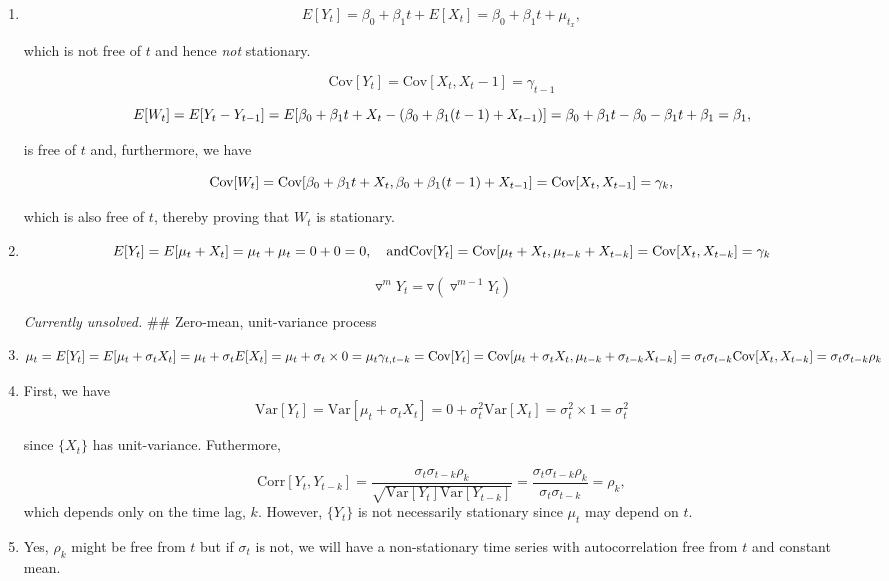 \documentclass[]{book}
\begin{document}
\begin{enumerate}
\def\labelenumi{(\alph{enumi})}
\item
  \[
    E[Y_t] = \beta_0 + \beta_1 t + E[X_t] = \beta_0 + \beta_1 t + \mu_{t_x},
  \]

  which is not free of \(t\) and hence \emph{not} stationary.

  \[
    \text{Cov}[Y_t] = \text{Cov}[X_t, X_t-1] = \gamma_{t-1}
  \]

  \[
    E[W_t] = E[Y_t - Y_{t-1}] = E[\beta_0 + \beta_1 t + X_t - (\beta_0 + \beta_1(t-1) + X_{t-1})] =\\
    \beta_0 + \beta_1 t - \beta_0 - \beta_1 t + \beta_1  = \beta_1,
  \]

  is free of \(t\) and, furthermore, we have

  \[
    \text{Cov}[W_t] = \text{Cov}[\beta_0 + \beta_1 t + X_t, \beta_0 + \beta_1 (t-1) + X_{t-1}] =\\
    \text{Cov}[X_t, X_{t-1}] = \gamma_k,  
  \]

  which is also free of \(t\), thereby proving that \(W_t\) is
  stationary.
\item
  \[
    E[Y_t] = E[\mu_t + X_t] = \mu_t + \mu_t = 0 + 0 = 0, \quad \text{and}\\
    \text{Cov}[Y_t] = \text{Cov}[\mu_t + X_t, \mu_{t-k} + X_{t-k}] = \text{Cov}[X_t, X_{t-k}] = \gamma_k
  \]

  \[
    \triangledown^m Y_t = \triangledown(\triangledown^{m−1}Y_t)
  \]

  \emph{Currently unsolved.} \#\# Zero-mean, unit-variance process
\item
  \[
    \mu_t = E[Y_t] = E[\mu_t + \sigma_t X_t] = \mu_t + \sigma_t E[X_t] = \mu_t + \sigma_t \times 0 = \mu_t\\
    \gamma_{t,t-k} = \text{Cov}[Y_t] = \text{Cov}[\mu_t + \sigma_t X_t, \mu_{t-k} + \sigma_{t-k} X_{t-k}] = 
      \sigma_t \sigma_{t-k} \text{Cov}[X_t, X_{t-k}] = \sigma_t \sigma_{t-k} \rho_k
  \]
\item
  First, we have \[
    \text{Var}[Y_t] = \text{Var}[\mu_t + \sigma_t X_t] = 0 + \sigma_t^2 \text{Var}[X_t] = \sigma_t^2 \times 1 = \sigma_t^2
  \]

  since \(\{X_t\}\) has unit-variance. Futhermore,

  \[
    \text{Corr}[Y_t, Y_{t-k}] = \frac{\sigma_t \sigma_{t-k} \rho_k}{\sqrt{\text{Var}[Y_t]\text{Var}[Y_{t-k}]}} = 
      \frac{\sigma_t \sigma_{t-k}\rho_k}{\sigma_t \sigma_{t-k}} = \rho_k,
  \] which depends only on the time lag, \(k\). However, \(\{Y_t\}\) is
  not necessarily stationary since \(\mu_t\) may depend on \(t\).
\item
  Yes, \(\rho_k\) might be free from \(t\) but if \(\sigma_t\) is not,
  we will have a non-stationary time series with autocorrelation free
  from \(t\) and constant mean.
\end{enumerate}
\end{document}
